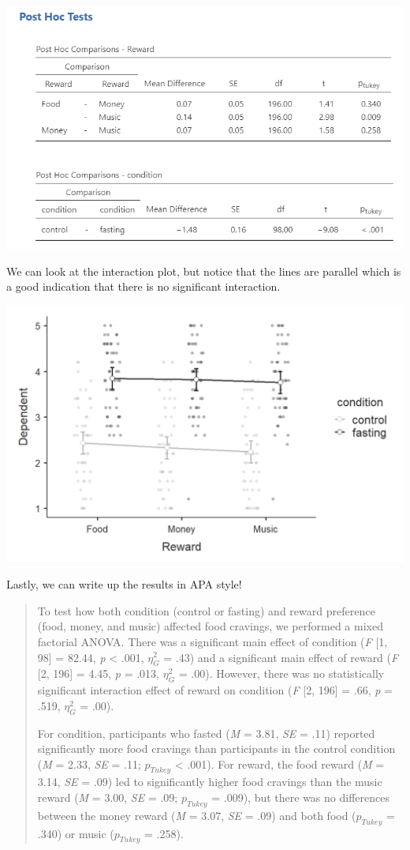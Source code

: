 \documentclass[
]{book}
\begin{document}
\includegraphics{images/06-factorial-anova/mixed_posthoc.png}

We can look at the interaction plot, but notice that the lines are parallel which is a good indication that there is no significant interaction.

\includegraphics{images/06-factorial-anova/mixed_interaction.png}

Lastly, we can write up the results in APA style!

\begin{quote}
To test how both condition (control or fasting) and reward preference (food, money, and music) affected food cravings, we performed a mixed factorial ANOVA. There was a significant main effect of condition (\emph{F} {[}1, 98{]} = 82.44, \emph{p} \textless{} .001, \(\eta^2_G\) = .43) and a significant main effect of reward (\emph{F} {[}2, 196{]} = 4.45, \emph{p} = .013, \(\eta^2_G\) = .00). However, there was no statistically significant interaction effect of reward on condition (\emph{F} {[}2, 196{]} = .66, \emph{p} = .519, \(\eta^2_G\) = .00).

For condition, participants who fasted (\emph{M} = 3.81, \emph{SE} = .11) reported significantly more food cravings than participants in the control condition (\emph{M} = 2.33, \emph{SE} = .11; \(p_{Tukey}\) \textless{} .001). For reward, the food reward (\emph{M} = 3.14, \emph{SE} = .09) led to significantly higher food cravings than the music reward (\emph{M} = 3.00, \emph{SE} = .09; \(p_{Tukey}\) = .009), but there was no differences between the money reward (\emph{M} = 3.07, \emph{SE} = .09) and both food (\(p_{Tukey}\) = .340) or music (\(p_{Tukey}\) = .258).
\end{quote}
\end{document}
